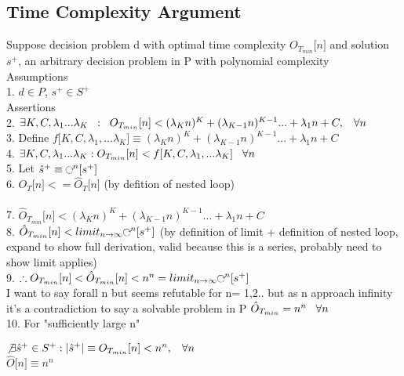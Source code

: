 \documentclass[11pt]{article}
\def \nestedloop {\ensuremath{\rotatebox[origin=c]{-90}{$\circlearrowright$}}^n}
\begin{document}
\subsection{Time Complexity Argument}
Suppose decision problem d with optimal time complexity $O_{T_{min}}\lbrack n \rbrack$ and solution $s^+$, an arbitrary decision problem in P with polynomial complexity\\
Assumptions\\
1. $d \in P$, $s^{+} \in S^{+}$\\
Assertions\\
2. $\exists K,C,\lambda_1...\lambda_K \hspace{2mm} : \hspace{2mm} O_{T_{min}}\lbrack n \rbrack < (\lambda_K n)^K + (\lambda_{K-1} n)^{K-1}... + \lambda_1 n + C, \hspace{3mm} \forall n\hspace{1mm}$
\\
3. Define $ f\lbrack K,C, \lambda_1,...\lambda_K \rbrack \equiv (\lambda_K n)^K + (\lambda_{K-1} n)^{K-1}... + \lambda_1 n + C$\\
4.  $\exists K,C,\lambda_1...\lambda_K : O_{T_{min}}\lbrack n \rbrack <   f\lbrack K,C, \lambda_1,...\lambda_K \rbrack \hspace{3mm} \forall n$\\
5. Let $\hat{s}^{+} \equiv \nestedloop \lbrack s^{+} \rbrack$\\
6. $O_T \lbrack n \rbrack <= \hat{O}_T \lbrack n\rbrack$ (by defition of nested loop)\\
\\
7.  $\hat{O}_{T_{min}}\lbrack n \rbrack < (\lambda_K n)^K + (\lambda_{K-1} n)^{K-1}... + \lambda_1 n + C$\\
8. $\hat{O}_{T_{min}} \lbrack n \rbrack < limit_{n \rightarrow \infty}  \nestedloop \lbrack s^{+} \rbrack$ (by definition of limit + definition of nested loop, expand to show full derivation, valid because this is a series, probably need to show limit applies)\\
9. $\therefore  O_{T_{min}}\lbrack n \rbrack < \hat{O}_{T_{min}} \lbrack n \rbrack < n^n  =  limit_{n \rightarrow \infty} \nestedloop \lbrack s^{+} \rbrack$
\\
I want to say forall n but seems refutable for n= 1,2.. but as n approach infinity it's a contradiction to say a solvable problem in P $\hat{O}_{T_{min}} = n^n \hspace{3mm} \forall n$\\
10. For "sufficiently large n"
\begin{center}
$
\not \exists \hat{s}^{+} \in S^{+} : | \hat{s}^{+} | \equiv O_{T_{min}} \lbrack n \rbrack <  n^n, \hspace{3mm} \forall n
$
\\
$
\hat{O} \lbrack n \rbrack \equiv n^n
$
\end{center}
\end{document}
